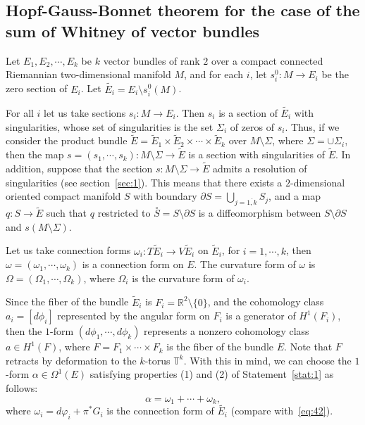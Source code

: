 \documentclass[12pt,letterpaper]{amsart}
\theoremstyle{definition}
\theoremstyle{plain}
\theoremstyle{remark}
\begin{document}
\subsection{Hopf-Gauss-Bonnet theorem for the case of the sum of Whitney of vector bundles}
\label{subsec:5_3}
Let $E_1, E_2, \cdots, E_k$ be $k$ vector bundles of rank $2$ over a compact connected Riemannian two-dimensional manifold $M$, and for each $i$, let $s^0_i: M \rightarrow E_i$ be the zero section of $E_i$.
Let $\tilde{E_i} = E_i \setminus s^0_i(M)$.

For all $i$ let us take sections $s_i : M \rightarrow E_i$.
Then $s_i$ is a section of $\tilde{E_i}$ with singularities, whose set of singularities is the set $\Sigma_i$ of zeros of $s_i$.
Thus, if we consider the product bundle $\tilde{E}=\tilde{E}_1\times \tilde{E}_2 \times \cdots \times \tilde{E}_k$ over $M\setminus \Sigma$, where $\Sigma=\cup \Sigma_i$, then the map $s=(s_1, \cdots,s_k) : M\setminus \Sigma \rightarrow \tilde{E}$ is a section with singularities of $\tilde{E}$.
In addition, suppose that the section $s : M\setminus \Sigma \rightarrow \tilde{E}$ admits a resolution of singularities (see section~\ref{sec:1}).
This means that there exists a $2$-dimensional oriented compact manifold $S$ with boundary $ \partial S =\bigcup_{j= \overline {1, k}} S_{j}$, and a map $q: S \rightarrow \tilde{E}$ such that $q$ restricted to $\overset{\circ}{S} = S \setminus \partial S$ is a diffeomorphism between $S \setminus \partial S$ and $s(M \setminus \Sigma)$.

Let us take connection forms $\omega_i: T\tilde{E}_i \rightarrow V\tilde{E}_i$ on $\tilde{E}_i$, for $i=1, \cdots, k$, then $\omega=(\omega_1, \cdots, \omega_k)$ is a connection form on $E$.
The curvature form of $\omega$ is $\Omega=(\Omega_1, \cdots, \Omega_k)$, where $\Omega_i$ is the curvature form of $\omega_i$.

Since the fiber of the bundle $\tilde{E}_i$ is $F_i=\mathbb{R}^{2}\setminus \{ 0 \}$, and the cohomology class $a_i=[d\phi_i]$ represented by the angular form on $F_i$ is a generator of $H^{1}(F_i)$, then the $1$-form $(d\phi_1, \cdots, d\phi_k)$ represents a nonzero cohomology class $a \in H^{1}(F)$, where $F=F_1\times \cdots \times F_k$ is the fiber of the bundle $E$.
Note that $F$ retracts by deformation to the $k$-torus $\mathbb{T}^k$.
With this in mind, we can choose the $1$-form $\alpha\in \Omega^{1}(E)$ satisfying properties (1) and (2) of Statement~\ref{stat:1} as follows:
\begin{equation}
\alpha = \omega_1 + \cdots + \omega_k,
\label{eq:87}
\end{equation}
where $\omega_i = d\varphi_i + \pi^* G_i$ is the connection form of $\tilde{E_i}$ (compare with~\eqref{eq:42}).
\end{document}

